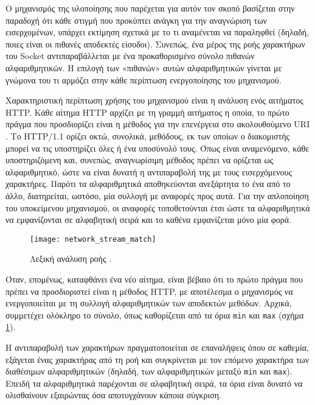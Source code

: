 Ο μηχανισμός της υλοποίησης που παρέχεται για αυτόν τον σκοπό βασίζεται στην
παραδοχή ότι κάθε στιγμή που προκύπτει ανάγκη για την αναγνώριση των
εισερχομένων, υπάρχει εκτίμηση σχετικά με το τι αναμένεται να παραληφθεί
(δηλαδή, ποιες είναι οι πιθανές αποδεκτές είσοδοι). Συνεπώς, ένα μέρος της ροής
χαρακτήρων του Socket αντιπαραβάλλεται με ένα προκαθορισμένο σύνολο πιθανών
αλφαριθμητικών. Η επιλογή των «πιθανών» αυτών αλφαριθμητικών γίνεται με γνώμονα
του τι αρμόζει στην κάθε περίπτωση ενεργοποίησης του μηχανισμού.

Χαρακτηριστική περίπτωση χρήσης του μηχανισμού είναι η ανάλυση ενός αιτήματος
HTTP. Κάθε αίτημα HTTP αρχίζει με τη γραμμή αιτήματος η οποία, το πρώτο πράγμα
που προσδιορίζει είναι η μέθοδος για την επενέργεια στο ακολουθούμενο URI
\parencite[35]{rfc2616}. Το HTTP\slash 1.1 ορίζει οκτώ, συνολικά, μεθόδους, εκ
των οποίων ο διακομιστής μπορεί να τις υποστηρίζει όλες ή ένα υποσύνολό τους.
Όπως είναι αναμενόμενο, κάθε υποστηριζόμενη και, συνεπώς, αναγνωρίσιμη μέθοδος
πρέπει να ορίζεται ως αλφαριθμητικό, ώστε να είναι δυνατή η αντιπαραβολή της με
τους εισερχόμενους χαρακτήρες. Παρότι τα αλφαριθμητικά αποθηκεύονται ανεξάρτητα
το ένα από το άλλο, διατηρείται, ωστόσο, μία συλλογή με αναφορές προς αυτά.
Για την απλοποίηση του υποκείμενου μηχανισμού, οι αναφορές τοποθετούνται έτσι
ώστε τα αλφαριθμητικά να εμφανίζονται σε αλφαβητική σειρά και το καθένα
εμφανίζεται μόνο μία φορά.

\begin{figure}
    \caption{Λεξική ανάλυση ροής . \label{fig:network:stream_match}}
    \begin{center}
    \texttt{[image: network\_stream\_match]}
    \end{center}
\end{figure}

Όταν, επομένως, καταφθάνει ένα νέο αίτημα, είναι βέβαιο ότι το πρώτο πράγμα που
πρέπει να προσδιοριστεί είναι η μέθοδος HTTP, με αποτέλεσμα ο μηχανισμός να
ενεργοποιείται με τη συλλογή αλφαριθμητικών των αποδεκτών μεθόδων. Αρχικά,
συμμετέχει ολόκληρο το σύνολο, όπως καθορίζεται από τα όρια \verb~min~ και
\verb~max~ (σχήμα \ref{fig:network:stream_match}).

Η αντιπαραβολή των χαρακτήρων πραγματοποιείται σε επαναλήψεις όπου σε καθεμία,
εξάγεται ένας χαρακτήρας από τη ροή και συγκρίνεται με τον επόμενο χαρακτήρα
των διαθέσιμων αλφαριθμητικών (δηλαδή, των αλφαριθμητικών μεταξύ \verb~min~ και
\verb~max~). Επειδή τα αλφαριθμητικά παρέχονται σε αλφαβητική σειρά, τα όρια
είναι δυνατό να ολισθαίνουν εξαιρώντας όσα αποτυγχάνουν κάποια σύγκριση.

